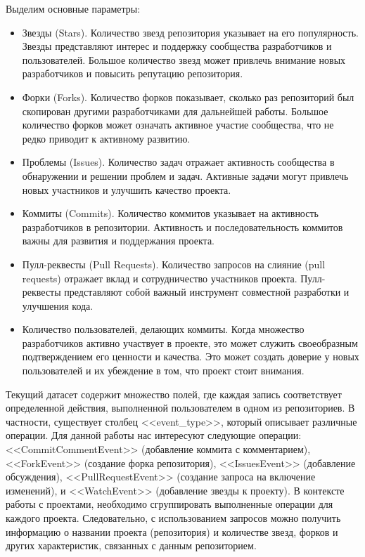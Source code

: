  Выделим основные параметры:
 \begin{itemize}
     \item Звезды (Stars). Количество звезд  репозитория указывает на его популярность. Звезды представляют интерес и поддержку сообщества разработчиков и пользователей. Большое количество звезд может привлечь внимание новых разработчиков и повысить репутацию репозитория.
     \item Форки (Forks). Количество форков показывает, сколько раз репозиторий был скопирован другими разработчиками для дальнейшей работы. Большое количество форков может означать активное участие сообщества, что не редко приводит к активному развитию.
    \item Проблемы (Issues). Количество задач отражает активность сообщества в обнаружении и решении проблем и задач. Активные задачи могут привлечь новых участников и улучшить качество проекта.
    \item Коммиты (Commits). Количество коммитов указывает на активность разработчиков в репозитории. Активность и последовательность коммитов важны для развития и поддержания проекта.
    \item Пулл-реквесты (Pull Requests). Количество запросов на слияние (pull requests) отражает вклад и сотрудничество участников проекта. Пулл-реквесты представляют собой важный инструмент совместной разработки и улучшения кода.
    \item Количество пользователей, делающих коммиты. Когда множество разработчиков активно участвует в проекте, это может служить своеобразным подтверждением его ценности и качества. Это может создать доверие у новых пользователей и их убеждение в том, что проект стоит внимания.
 \end{itemize}

 Текущий датасет содержит множество полей, где каждая запись соответствует определенной действия, выполненной пользователем в одном из репозиториев. В частности, существует столбец <<event\_type>>, который описывает различные операции. Для данной работы нас интересуют следующие операции: <<CommitCommentEvent>> (добавление коммита с комментарием), <<ForkEvent>> (создание форка репозитория), <<IssuesEvent>> (добавление обсуждения), <<PullRequestEvent>> (создание запроса на включение изменений), и <<WatchEvent>> (добавление звезды к проекту). В контексте работы с проектами, необходимо сгруппировать выполненные операции для каждого проекта. Следовательно, с использованием запросов можно получить информацию о названии проекта (репозитория) и количестве звезд, форков и других характеристик, связанных с данным репозиторием.

